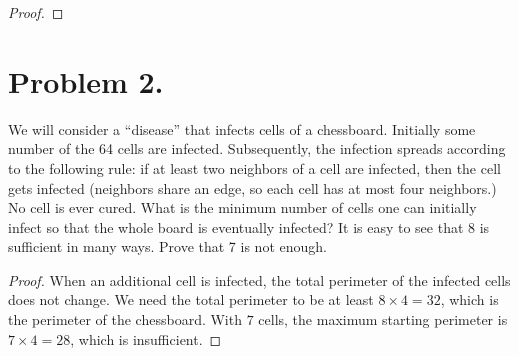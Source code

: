 \documentclass{article}
\begin{document}
\begin{enumerate}[label=(\alph*)]
\begin{proof}
    \end{proof}
\end{enumerate}


\section{Problem 2.}
We will consider a “disease” that infects cells of a chessboard. Initially some number of the 64 cells are infected. Subsequently, the infection spreads according to the following rule: if at least two neighbors of a cell are infected, then the cell gets infected (neighbors share an edge, so each cell has at most four neighbors.) No cell is ever cured. What is the minimum number of cells one can initially infect so that the whole board is eventually infected? It is easy to see that 8 is sufficient in many ways. Prove that 7 is not enough.
\begin{proof}
When an additional cell is infected, the total perimeter of the infected cells does not change. We need the total perimeter to be at least $8\times4=32$, which is the perimeter of the chessboard. With $7$ cells, the maximum starting perimeter is $7\times4=28$, which is insufficient.
\end{proof}
\end{document}
